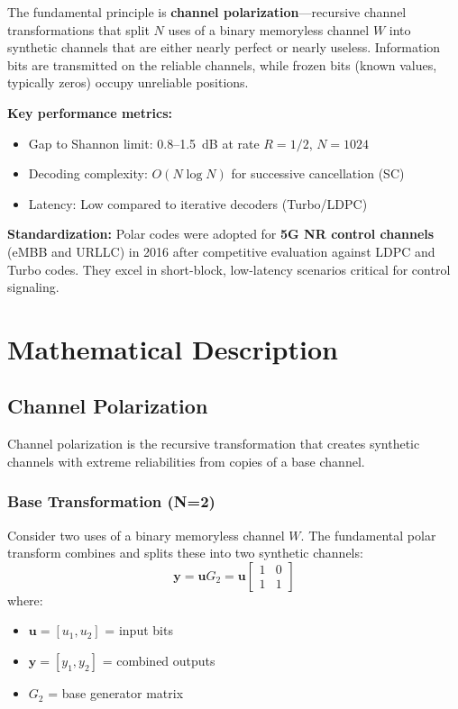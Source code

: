 The fundamental principle is \textbf{channel polarization}---recursive channel transformations that split $N$ uses of a binary memoryless channel $W$ into synthetic channels that are either nearly perfect or nearly useless. Information bits are transmitted on the reliable channels, while frozen bits (known values, typically zeros) occupy unreliable positions.

\textbf{Key performance metrics:}
\begin{itemize}
\item Gap to Shannon limit: 0.8--1.5~dB at rate $R = 1/2$, $N = 1024$
\item Decoding complexity: $O(N \log N)$ for successive cancellation (SC)
\item Latency: Low compared to iterative decoders (Turbo/LDPC)
\end{itemize}

\textbf{Standardization:} Polar codes were adopted for \textbf{5G NR control channels} (eMBB and URLLC) in 2016 after competitive evaluation against LDPC and Turbo codes. They excel in short-block, low-latency scenarios critical for control signaling.

\section{Mathematical Description}

\subsection{Channel Polarization}

Channel polarization is the recursive transformation that creates synthetic channels with extreme reliabilities from copies of a base channel.

\subsubsection{Base Transformation (N=2)}

Consider two uses of a binary memoryless channel $W$. The fundamental polar transform combines and splits these into two synthetic channels:
\begin{equation}
\mathbf{y} = \mathbf{u} G_2 = \mathbf{u} \begin{bmatrix} 1 & 0 \\ 1 & 1 \end{bmatrix}
\end{equation}
where:
\begin{itemize}
\item $\mathbf{u} = [u_1, u_2]$ = input bits
\item $\mathbf{y} = [y_1, y_2]$ = combined outputs
\item $G_2$ = base generator matrix
\end{itemize}

